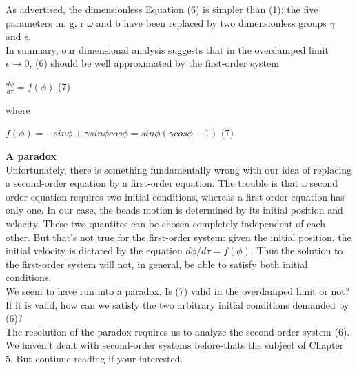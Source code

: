\documentclass{article}
\newcommand\tab[1][1cm]{\hspace*{#1}}
\begin{document}
As advertised, the dimensionless Equation (6) is simpler than (1): the five parameters m, g, r $\omega$ and b have been replaced by two dimensionless groups $\gamma$ and $\epsilon$. \\
\tab In summary, our dimensional analysis suggests that in the overdamped limit $\epsilon \to 0$, (6) should be well approximated by the first-order system
\begin{center}
$\frac{d\phi}{d\tau}=f(\phi)$ \tab (7)
\end{center}
where
\begin{center}
$f(\phi) = - sin \phi + \gamma sin \phi cos \phi = sin \phi (\gamma cos \phi -1)$ \tab (7)
\end{center}
\textbf {A paradox}
\\ \tab Unfortunately, there is something fundamentally wrong with our idea of replacing a second-order equation by a first-order equation. The trouble is that a second order equation requires two initial conditions, whereas a first-order equation has only one. In our case, the beads motion is determined by its initial position and velocity. These two quantites can be chosen completely independent of each other. But that's not true for the first-order system: given the initial position, the initial velocity is dictated by the equation $d\phi / d \tau = f(\phi)$. Thus the solution to the first-order system will not, in general, be able to satisfy both initial conditions. \\
\tab
We seem to have run into a paradox. Is (7) valid in the overdamped limit or not? If it is valid, how can we satisfy the two arbitrary initial conditions demanded by (6)? \\
\tab The resolution of the paradox requires us to analyze the second-order system (6). We haven't dealt with second-order systems before-thats the subject of Chapter 5. But continue reading if your interested.
\end{document}
